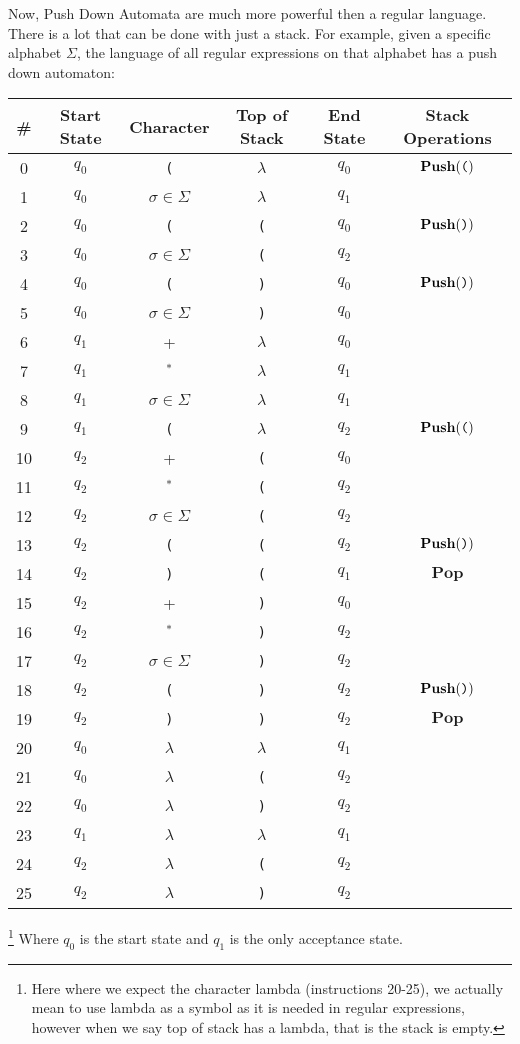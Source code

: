 \documentclass{article}
\begin{document}
	Now, Push Down Automata are much more powerful then a regular language. There is a lot that can be done with just a stack. For example, given a specific alphabet $\Sigma$, the language of all regular expressions on that alphabet has a push down automaton:
	\begin{center}
		\begin{tabular}{c|c|c|c|c|c}
			\#&Start State & Character & Top of Stack & End State &Stack Operations\\
			\hline
			0&$q_0$ & \verb|(| & $\lambda$ & $q_0$ & $\textbf{Push}(\verb|(|)$ \\
			
			1&$q_0$ & $\sigma \in \Sigma$ & $\lambda$ & $q_1$&\\ 
			2&$q_0$ & \verb|(| & \verb|(| & $q_0$&$\textbf{Push}(\verb|)|)$\\
			3&$q_0$ & $\sigma \in \Sigma$ & \verb|(| & $q_2$&\\
			4&$q_0$ & \verb|(| & \verb|)| & $q_0$ & $\textbf{Push}(\verb|)|)$ \\
			5&$q_0$ & $\sigma\in\Sigma$ & \verb|)| & $q_0$ & \\
			6&$q_1$ & + & $\lambda$ & $q_0$ & \\
			7&$q_1$ & $^*$ & $\lambda$ & $q_1$&\\
			8&$q_1$ & $\sigma \in \Sigma$ & $\lambda$ & $q_1$&\\
			9&$q_1$ & \verb|(| & $\lambda$ &$q_2$& $\textbf{Push}(\verb|(|)$ \\
			10&$q_2$ & + & \verb|(| & $q_0$& \\
			11&$q_2$ & $^*$ & \verb|(| & $q_2$&\\
			12&$q_2$ & $\sigma \in \Sigma$ & \verb|(| & $q_2$&\\
			13&$q_2$ & \verb|(| & \verb|(| &$q_2$& $\textbf{Push}(\verb|)|)$\\
			14&$q_2$ & \verb|)| & \verb|(| &$q_1$&$\textbf{Pop}$\\
			15&$q_2$ & + & \verb|)| & $q_0$& \\
			16&$q_2$ & $^*$ & \verb|)| & $q_2$&\\
			17&$q_2$ & $\sigma \in \Sigma$ & \verb|)| & $q_2$&\\
			18&$q_2$ & \verb|(| & \verb|)| &$q_2$& $\textbf{Push}(\verb|)|)$\\
			19&$q_2$ & \verb|)| & \verb|)| &$q_2$&$\textbf{Pop}$\\
			20&$q_0$ & $\lambda$ & $\lambda$ & $q_1$ &\\
			21&$q_0$ & $\lambda$ & \verb|(| & $q_2$&\\
			22&$q_0$ & $\lambda$ & \verb|)| & $q_2$&\\
			23&$q_1$&$\lambda$&$\lambda$&$q_1$&\\
			24&$q_2$&$\lambda$&\verb|(|&$q_2$&\\
			25&$q_2$&$\lambda$&\verb|)|&$q_2$&
		\end{tabular}
	\end{center}\footnote{Here where we expect the character lambda (instructions 20-25), we actually mean to use lambda as a symbol as it is needed in regular expressions, however when we say top of stack has a lambda, that is the stack is empty.}
	Where $q_0$ is the start state and $q_1$ is the only acceptance state.
	
\end{document}
